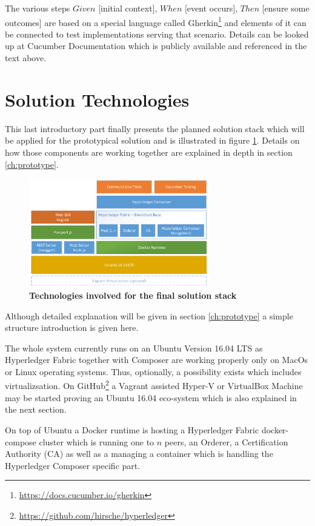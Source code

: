The various steps $Given$ [initial context], $When$ [event occurs], $Then$ [ensure some outcomes] are based on a special language called Gherkin\footnote{\url{https://docs.cucumber.io/gherkin}} and elements of it can be connected to test implementations serving that scenario. Details can be looked up at Cucumber Documentation which is publicly available and referenced in the text above.
  
\section{Solution Technologies}
\label{sec:solution}

This last introductory part finally presents the planned solution stack which will be applied for the prototypical solution and is illustrated in figure \ref{fig:solution-stack}. Details on how those components are working together are explained in depth in section \ref{ch:prototype}.

\begin{figure}[htbp]
  \centering
  \includegraphics[width=0.7\textwidth, clip, trim=1mm 1mm 1mm 1mm]{Figures/solution-stack}
  \caption{\bf\small Technologies involved for the final solution stack}
  \label{fig:solution-stack}
\end{figure}

Although detailed explanation will be given in section \ref{ch:prototype} a simple structure introduction is given here.

The whole system currently runs on an Ubuntu Version 16.04 LTS as Hyperledger Fabric together with Composer are working properly only on MacOs or Linux operating systems. Thus, optionally, a possibility exists which includes virtualizsation. On GitHub\footnote{\url{https://github.com/hirsche/hyperledger}} a Vagrant assisted Hyper-V or VirtualBox Machine may be started proving an Ubuntu 16.04 eco-system which is also explained in the next section.

On top of Ubuntu a Docker runtime is hosting a Hyperledger Fabric docker-compose cluster which is running one to $n$ peers, an Orderer, a Certification Authority (CA) as well as a managing a container which is handling the Hyperledger Composer specific part.

